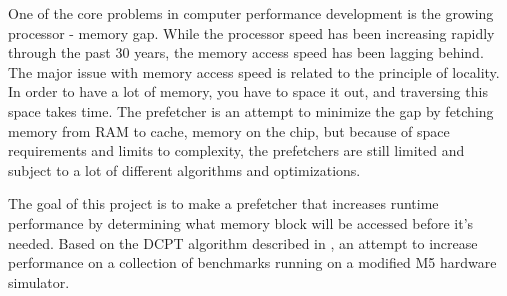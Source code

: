 One of the core problems in computer performance development is the growing processor - memory gap. While the processor speed has been increasing rapidly through the past 30 years, the memory access speed has been lagging behind. The major issue with memory access speed is related to the principle of locality. In order to have a lot of memory, you have to space it out, and traversing this space takes time. The prefetcher is an attempt to minimize the gap by fetching memory from RAM to cache, memory on the chip, but because of space requirements and limits to complexity, the prefetchers are still limited and subject to a lot of different algorithms and optimizations.

The goal of this project is to make a prefetcher that increases runtime performance by determining what memory block will be accessed before it's needed. Based on the DCPT algorithm described in \cite{reference:jahre}, an attempt to increase performance on a collection of benchmarks running on a modified M5 hardware simulator. 


